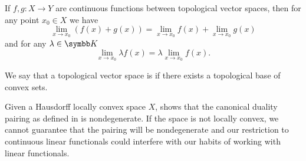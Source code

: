 \begin{corollary}\label{thm:linearity_of_function_limits}
  If \( f, g: X \to Y \) are continuous functions between topological vector spaces, then for any point \( x_0 \in X \) we have
  \begin{equation*}
    \lim_{x \to x_0} (f(x) + g(x)) = \lim_{x \to x_0} f(x) + \lim_{x \to x_0} g(x)
  \end{equation*}
  and for any \( \lambda \in \BK \)
  \begin{equation*}
    \lim_{x \to x_0} \lambda f(x) = \lambda \lim_{x \to x_0} f(x).
  \end{equation*}
\end{corollary}

\begin{definition}\label{def:locally_convex_space}\cite[1.8]{Rudin1991}
  We say that a topological vector space is  if there exists a topological base of convex sets.
\end{definition}

\begin{remark}\label{def:locally_convex_duality_pairing}
  Given a Hausdorff locally convex space \( X \),  shows that the canonical duality pairing as defined in  is nondegenerate. If the space is not locally convex, we cannot guarantee that the pairing will be nondegenerate and our restriction to continuous linear functionals could interfere with our habits of working with linear functionals.
\end{remark}
